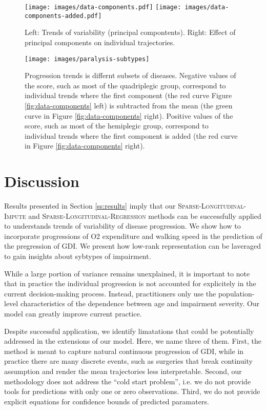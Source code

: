 \documentclass[preprint]{imsart}
\numberwithin{equation}{section}
\theoremstyle{plain}
\begin{document}
\begin{figure}[h!]
  \texttt{[image: images/data-components.pdf]}
  \texttt{[image: images/data-components-added.pdf]}
\caption{Left: Trends of variability (principal compontents). Right: Effect of principal components on individual trajectories.}
    \label{fig:data-components}
  \texttt{[image: images/paralysis-subtypes]}
\caption{Progression trends is differnt subsets of diseases. Negative values of the score, such as most of the quadriplegic group, correspond to individual trends where the first component (the red curve Figure \ref{fig:data-components} left) is subtracted from the mean (the green curve in Figure \ref{fig:data-components} right). Positive values of the score, such as most of the hemiplegic group, correspond to individual trends where the first component is added (the red curve in Figure \ref{fig:data-components} right).}
    \label{fig:subtypes}
\end{figure}

\section{Discussion}

Results presented in Section \ref{ss:results} imply that our \textsc{Sparse-Longitudinal-Impute} and \textsc{Sparse-Longitudinal-Regression} methods can be successfully applied to understands trends of variability of disease progression. We show how to incorporate progressions of O2 expenditure and walking speed in the prediction of the pregression of GDI. We present how low-rank representation can be laveraged to gain insights about sybtypes of impairment.

While a large portion of variance remains unexplained, it is important to note that in practice the individual progression is not accounted for explicitely in the current decision-making process. Instead, practitioners only use the population-level characteristics of the dependence between age and impairment severity. Our model can greatly improve current practice.

Despite successful application, we identify limatations that could be potentially addressed in the extensions of our model. Here, we name three of them. First, the method is meant to capture natural continuous progression of GDI, while in practice there are many discrete events, such as surgeries that break continuity assumption and render the mean trajectories less interpretable. Second, our methodology does not address the ``cold start problem'', i.e. we do not provide tools for predictions with only one or zero observations. Third, we do not provide explicit equations for confidence bounds of predicted paramaters.
\end{document}
